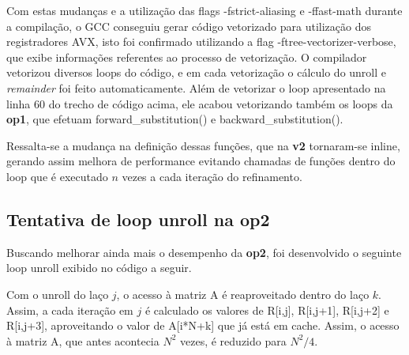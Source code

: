 \documentclass[12pt]{article}
\begin{document}
Com estas mudanças e a utilização das flags -fstrict-aliasing e -ffast-math durante a compilação, o GCC conseguiu gerar código vetorizado para utilização dos registradores AVX, isto foi confirmado utilizando a flag -ftree-vectorizer-verbose, que exibe informações referentes ao processo de vetorização. O compilador vetorizou diversos loops do código, e em cada vetorização o cálculo do unroll e \emph{remainder} foi feito automaticamente. Além de vetorizar o loop apresentado na linha 60 do trecho de código acima, ele acabou vetorizando também os loops da \textbf{op1}, que efetuam forward\_substitution() e backward\_substitution().

Ressalta-se a mudança na definição dessas funções, que na \textbf{v2} tornaram-se inline, gerando assim melhora de performance evitando chamadas de funções dentro do loop que é executado $n$ vezes a cada iteração do refinamento.

\subsection{Tentativa de loop unroll na op2}

Buscando melhorar ainda mais o desempenho da \textbf{op2}, foi desenvolvido o seguinte loop unroll exibido no código a seguir.

Com o unroll do laço $j$, o acesso à matriz A é reaproveitado dentro do laço $k$. Assim, a cada iteração em $j$ é calculado os valores de R[i,j], R[i,j+1], R[i,j+2] e R[i,j+3], aproveitando o valor de A[i*N+k] que já está em cache. Assim, o acesso à matriz A, que antes acontecia $N^2$ vezes, é reduzido para $N^2/4$.
\end{document}
